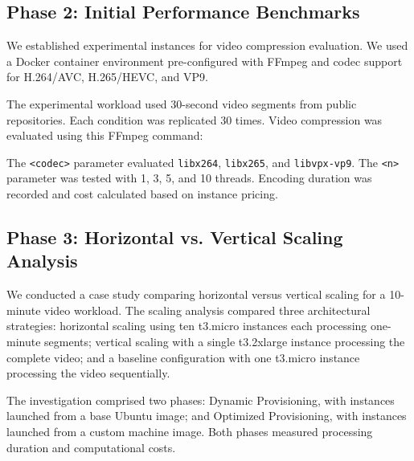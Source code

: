 \documentclass[conference]{IEEEtran}
\begin{document}
	\subsection{Phase 2: Initial Performance Benchmarks}
	\label{execution-initial-performance-benchmarks}
	
	We established experimental instances for video compression evaluation. We used a Docker container environment pre-configured with FFmpeg and codec support for H.264/AVC, H.265/HEVC, and VP9.
	
	The experimental workload used 30-second video segments from public repositories. Each condition was replicated 30 times. Video compression was evaluated using this FFmpeg command:
	
	\begin{center}
		{\ttfamily\scriptsize
		}
	\end{center}
	
	The \texttt{<codec>} parameter evaluated \texttt{libx264}, \texttt{libx265}, and \texttt{libvpx-vp9}. The \texttt{<n>} parameter was tested with 1, 3, 5, and 10 threads. Encoding duration was recorded and cost calculated based on instance pricing.
	
	\subsection{Phase 3: Horizontal vs. Vertical Scaling Analysis}
	
	We conducted a case study comparing horizontal versus vertical scaling for a 10-minute video workload. The scaling analysis compared three architectural strategies: horizontal scaling using ten t3.micro instances each processing one-minute segments; vertical scaling with a single t3.2xlarge instance processing the complete video; and a baseline configuration with one t3.micro instance processing the video sequentially.
	
	The investigation comprised two phases: Dynamic Provisioning, with instances launched from a base Ubuntu image; and Optimized Provisioning, with instances launched from a custom machine image. Both phases measured processing duration and computational costs.
	
\end{document}
